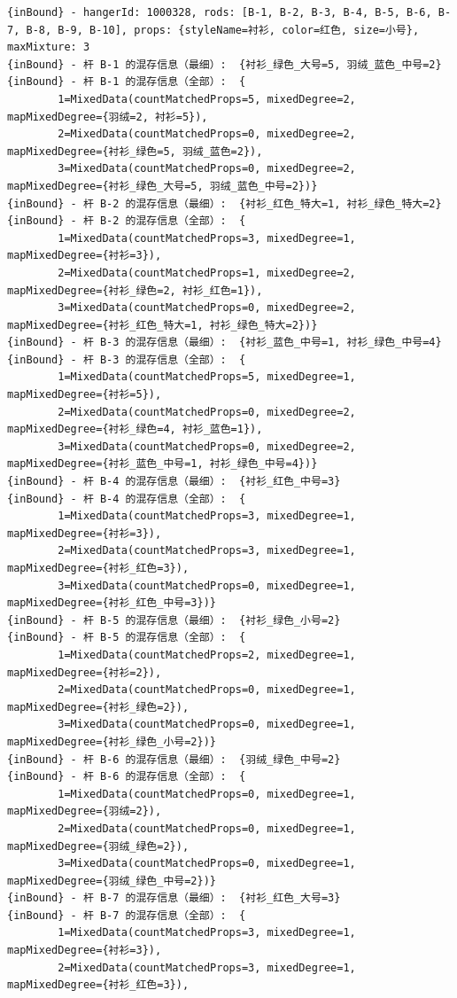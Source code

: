 {\begin{verbatim}
{inBound} - hangerId: 1000328, rods: [B-1, B-2, B-3, B-4, B-5, B-6, B-7, B-8, B-9, B-10], props: {styleName=衬衫, color=红色, size=小号}, maxMixture: 3
{inBound} - 杆 B-1 的混存信息（最细）:  {衬衫_绿色_大号=5, 羽绒_蓝色_中号=2}
{inBound} - 杆 B-1 的混存信息（全部）:  {
		1=MixedData(countMatchedProps=5, mixedDegree=2, mapMixedDegree={羽绒=2, 衬衫=5}), 
		2=MixedData(countMatchedProps=0, mixedDegree=2, mapMixedDegree={衬衫_绿色=5, 羽绒_蓝色=2}), 
		3=MixedData(countMatchedProps=0, mixedDegree=2, mapMixedDegree={衬衫_绿色_大号=5, 羽绒_蓝色_中号=2})}
{inBound} - 杆 B-2 的混存信息（最细）:  {衬衫_红色_特大=1, 衬衫_绿色_特大=2}
{inBound} - 杆 B-2 的混存信息（全部）:  {
		1=MixedData(countMatchedProps=3, mixedDegree=1, mapMixedDegree={衬衫=3}), 
		2=MixedData(countMatchedProps=1, mixedDegree=2, mapMixedDegree={衬衫_绿色=2, 衬衫_红色=1}), 
		3=MixedData(countMatchedProps=0, mixedDegree=2, mapMixedDegree={衬衫_红色_特大=1, 衬衫_绿色_特大=2})}
{inBound} - 杆 B-3 的混存信息（最细）:  {衬衫_蓝色_中号=1, 衬衫_绿色_中号=4}
{inBound} - 杆 B-3 的混存信息（全部）:  {
		1=MixedData(countMatchedProps=5, mixedDegree=1, mapMixedDegree={衬衫=5}), 
		2=MixedData(countMatchedProps=0, mixedDegree=2, mapMixedDegree={衬衫_绿色=4, 衬衫_蓝色=1}), 
		3=MixedData(countMatchedProps=0, mixedDegree=2, mapMixedDegree={衬衫_蓝色_中号=1, 衬衫_绿色_中号=4})}
{inBound} - 杆 B-4 的混存信息（最细）:  {衬衫_红色_中号=3}
{inBound} - 杆 B-4 的混存信息（全部）:  {
		1=MixedData(countMatchedProps=3, mixedDegree=1, mapMixedDegree={衬衫=3}), 
		2=MixedData(countMatchedProps=3, mixedDegree=1, mapMixedDegree={衬衫_红色=3}), 
		3=MixedData(countMatchedProps=0, mixedDegree=1, mapMixedDegree={衬衫_红色_中号=3})}
{inBound} - 杆 B-5 的混存信息（最细）:  {衬衫_绿色_小号=2}
{inBound} - 杆 B-5 的混存信息（全部）:  {
		1=MixedData(countMatchedProps=2, mixedDegree=1, mapMixedDegree={衬衫=2}), 
		2=MixedData(countMatchedProps=0, mixedDegree=1, mapMixedDegree={衬衫_绿色=2}), 
		3=MixedData(countMatchedProps=0, mixedDegree=1, mapMixedDegree={衬衫_绿色_小号=2})}
{inBound} - 杆 B-6 的混存信息（最细）:  {羽绒_绿色_中号=2}
{inBound} - 杆 B-6 的混存信息（全部）:  {
		1=MixedData(countMatchedProps=0, mixedDegree=1, mapMixedDegree={羽绒=2}), 
		2=MixedData(countMatchedProps=0, mixedDegree=1, mapMixedDegree={羽绒_绿色=2}), 
		3=MixedData(countMatchedProps=0, mixedDegree=1, mapMixedDegree={羽绒_绿色_中号=2})}
{inBound} - 杆 B-7 的混存信息（最细）:  {衬衫_红色_大号=3}
{inBound} - 杆 B-7 的混存信息（全部）:  {
		1=MixedData(countMatchedProps=3, mixedDegree=1, mapMixedDegree={衬衫=3}), 
		2=MixedData(countMatchedProps=3, mixedDegree=1, mapMixedDegree={衬衫_红色=3}), 

\end{verbatim}}
